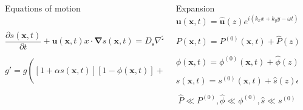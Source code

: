 \documentclass[final]{beamer} %
\begin{document}
\begin{frame}[t]
\begin{columns}[t]
\begin{column}{0.6\paperwidth}
\begin{columns}[t]
\begin{column}{0.43\paperwidth}
\begin{block}{Equations of motion}
\begin{columns}[t]
\begin{column}{0.3\paperwidth}
                    $$ \frac{\partial s(\mathbf{x}, t)}{\partial t} +
                    \mathbf{u}(\mathbf{x}, t)x \cdot \mathbf{\nabla} s(\mathbf{x}, t) =
                    D_{\text{s}} \nabla^{2} s(\mathbf{x}, t) $$

                    $$ g' = g \left( [1 + \alpha s(\mathbf{x}, t)] [1 - \phi(\mathbf{x}, t)]
                    + \frac{\rho_{p} \phi(\mathbf{x}, t)}{\rho_{0}} \right) $$

              \end{column}

            \end{columns}
          \end{block}
        \end{column}
        \begin{column}{0.17\paperwidth}
          \begin{block}{Expansion}
            $$ \mathbf{u}(\mathbf{x}, t) = \mathbf{\hat{u}}(z) e^{i(k_{x} x + k_{y} y - \omega t)}$$

            $$ P(\mathbf{x}, t) = P^{(0)}(\mathbf{x}, t) +
            \hat{P}(z) e^{i(k x - \omega t)}$$

            $$ \phi(\mathbf{x}, t) = \phi^{(0)}(\mathbf{x}, t) +
            \hat{\phi}(z) e^{i(k x - \omega t)}$$
      
            $$ s(\mathbf{x}, t) = s^{(0)}(\mathbf{x}, t) +
            \hat{s}(z) e^{i(k x - \omega t)}$$

            $$\hat{P} \ll P^{(0)}, \hat{\phi} \ll \phi^{(0)}, \hat{s} \ll s^{(0)}$$
          \end{block}

        \end{column}
      \end{columns}
      
    \end{column}

    \begin{column}{0.3\paperwidth}

      \vspace{-3cm}
      
      \begin{columns}[t]
        \begin{column}{0.12\paperwidth}

          \vspace{-2.2cm}


\end{column}
\end{columns}
\end{column}
\end{columns}
\end{frame}
\end{document}
